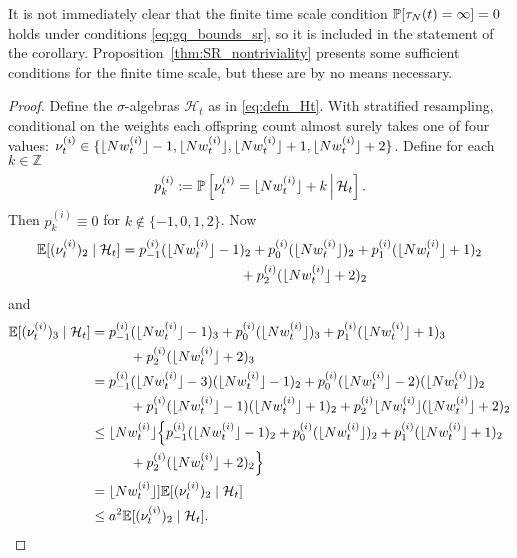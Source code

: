 It is not immediately clear that the finite time scale condition $\mathbb{P}[ \tau_N(t) = \infty] =0$ holds under conditions \eqref{eq:gq_bounds_sr}, so it is included in the statement of the corollary. Proposition~\ref{thm:SR_nontriviality} presents some sufficient conditions for the finite time scale, but these are by no means necessary.

\begin{proof}
Define the $\sigma$-algebras $\mathcal{H}_t$ as in \eqref{eq:defn_Ht}.
With stratified resampling, conditional on the weights each offspring count almost surely takes one of four values: $\nu_t^{(i)} \in \{ \lfloor N w_t^{(i)} \rfloor -1, \lfloor N w_t^{(i)} \rfloor, \lfloor N w_t^{(i)} \rfloor +1, \lfloor N w_t^{(i)} \rfloor +2 \}$.  
Define for each $k\in\mathbb{Z}$
\begin{equation}\label{eq:pk_defn}
p_k^{(i)} := \mathbb{P} \left[ \nu_t^{(i)} = \lfloor N w_t^{(i)} \rfloor + k \,\middle|\, \mathcal{H}_t \right] .
\end{equation}
Then $p_k^{(i)} \equiv 0$ for $k\notin \{-1,0,1,2\}$.
Now
\begin{align*}
\E [(\nu_t^{(i)})_2 \mid \mathcal{H}_t ]
&= p_{-1}^{(i)} (\flnw -1)_2 + p_0^{(i)} (\flnw)_2 + p_1^{(i)} (\flnw +1)_2 \\
    &\hspace{3cm} + p_2^{(i)} (\flnw +2)_2
\end{align*}
and
\begin{align}
\mathbb{E} [(\nu_t^{(i)})_3 \mid \mathcal{H}_t ]
&= p_{-1}^{(i)} (\lfloor N w_t^{(i)} \rfloor -1)_3 + p_0^{(i)} (\lfloor N w_t^{(i)} \rfloor)_3 + p_1^{(i)} (\lfloor N w_t^{(i)} \rfloor +1)_3 \notag\\
    &\hspace{1cm} + p_2^{(i)} (\lfloor N w_t^{(i)} \rfloor +2)_3 \notag\\
&= p_{-1}^{(i)} (\lfloor N w_t^{(i)} \rfloor -3)(\lfloor N w_t^{(i)} \rfloor -1)_2 + p_0^{(i)} (\lfloor N w_t^{(i)} \rfloor -2)(\lfloor N w_t^{(i)} \rfloor)_2 \notag\\
     &\hspace{1cm} + p_1^{(i)} (\lfloor N w_t^{(i)} \rfloor -1)(\lfloor N w_t^{(i)} \rfloor +1)_2 
         + p_2^{(i)} \lfloor N w_t^{(i)} \rfloor (\lfloor N w_t^{(i)} \rfloor +2)_2 \notag\\
&\leq \lfloor N w_t^{(i)} \rfloor \Big\{ p_{-1}^{(i)} (\lfloor N w_t^{(i)} \rfloor -1)_2 + p_0^{(i)} (\lfloor N w_t^{(i)} \rfloor)_2 
        + p_1^{(i)} (\lfloor N w_t^{(i)} \rfloor +1)_2 \notag\\
    &\hspace{1cm} + p_2^{(i)} (\lfloor N w_t^{(i)} \rfloor +2)_2 \Big\} \notag\\
&= \lfloor N w_t^{(i)} \rfloor ]\mathbb{E} [(\nu_t^{(i)})_2 \mid \mathcal{H}_t ] \notag\\
&\leq a^2 \mathbb{E} [(\nu_t^{(i)})_2 \mid \mathcal{H}_t ] . \label{eq:strat_v2_versus_v3}
\end{align}

\end{proof}
